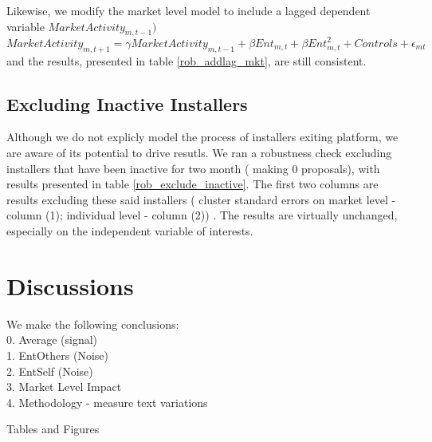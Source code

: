 \documentclass[msom,blindrev]{informs3}
\begin{document}
Likewise, we modify the market level model to include a lagged dependent variable $MarketActivity_{m,t-1})$
\begin{equation}
    MarketActivity_{m,t+1}=\gamma MarketActivity_{m,t-1}+\beta Ent_{m,t}+\beta Ent_{m,t}^2+Controls+\epsilon_{mt}
\end{equation}
and the results, presented in table \ref{rob_addlag_mkt}, are still consistent.




\subsection{Excluding Inactive Installers}
Although we do not explicly model the process of installers exiting platform, we are aware of its potential to drive resutls. We ran a robustness check excluding installers that have been inactive for two month ( making 0 proposals), with results presented in table \ref{rob_exclude_inactive}. The first two columns are results excluding these said installers ( cluster standard errors on market level - column (1); individual level - column (2)) . The results are virtually unchanged, especially on the independent variable of interests.


\section{Discussions}
We make the following conclusions: \\
0. Average (signal)  \\ 
1. EntOthers (Noise) \\
2. EntSelf (Noise) \\
3. Market Level Impact \\
4. Methodology - measure text variations 
\clearpage
\begin{APPENDIX}{Tables and Figures}









\end{APPENDIX}
\clearpage
%
%
%
\end{document}
